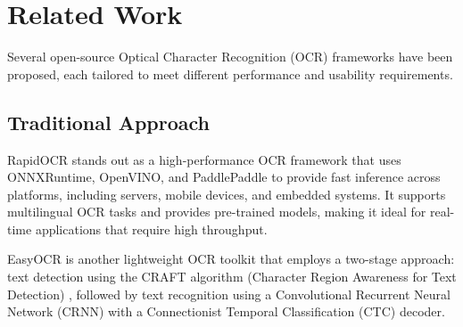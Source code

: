 \section{Related Work}
\label{sec:related_work}

Several open-source Optical Character Recognition (OCR) frameworks have been proposed, each tailored to meet different performance and usability requirements.\\ 

\subsection{Traditional Approach}
\noindent RapidOCR \cite{RapidOCR2021} stands out as a high-performance OCR framework that uses ONNXRuntime, OpenVINO, and PaddlePaddle \cite{paddleocr2023} to provide fast inference across platforms, including servers, mobile devices, and embedded systems. It supports multilingual OCR tasks and provides pre-trained models, making it ideal for real-time applications that require high throughput.

\noindent EasyOCR \cite{EasyOCR2024} is another lightweight OCR toolkit that employs a two-stage approach: text detection using the CRAFT algorithm (Character Region Awareness for Text Detection) \cite{baek2019character}, followed by text recognition using a Convolutional Recurrent Neural Network (CRNN) with a Connectionist Temporal Classification (CTC) \cite{graves2012connectionist} decoder.